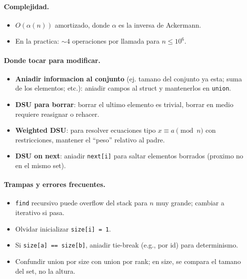 \paragraph{Complejidad.}
\begin{itemize}\setlength\itemsep{0pt}
	\item $O(\alpha(n))$ amortizado, donde $\alpha$ es la inversa de Ackermann.
	\item En la practica: $\sim 4$ operaciones por llamada para $n \le 10^6$.
\end{itemize}

\paragraph{Donde tocar para modificar.}
\begin{itemize}\setlength\itemsep{0pt}
	\item \textbf{Aniadir informacion al conjunto} (ej. tamano del conjunto ya esta; suma de los elementos; etc.): aniadir campos al struct y mantenerlos en \texttt{union}.
	\item \textbf{DSU para borrar}: borrar el ultimo elemento es trivial, borrar en medio requiere reasignar o rehacer.
	\item \textbf{Weighted DSU}: para resolver ecuaciones tipo $x \equiv a \pmod n$ con restricciones, mantener el ``peso'' relativo al padre.
	\item \textbf{DSU on next}: aniadir \texttt{next[i]} para saltar elementos borrados (proximo no en el mismo set).
\end{itemize}

\paragraph{Trampas y errores frecuentes.}
\begin{itemize}\setlength\itemsep{0pt}
	\item \texttt{find} recursivo puede overflow del stack para $n$ muy grande; cambiar a iterativo si pasa.
	\item Olvidar inicializar \texttt{size[i] = 1}.
	\item Si \texttt{size[a] == size[b]}, aniadir tie-break (e.g., por id) para determinismo.
	\item Confundir union por size con union por rank; en size, se compara el tamano del set, no la altura.
\end{itemize}

